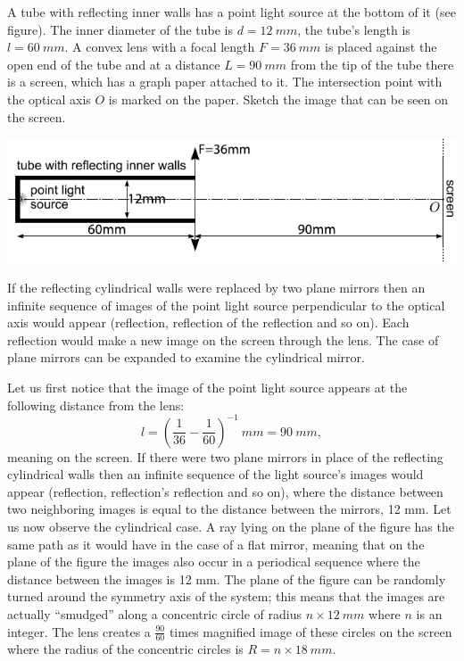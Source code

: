 {\ifEngStatement
A tube with reflecting inner walls has a point light source at the bottom of it (see figure). The inner diameter of the tube is $d=\SI{12}{mm}$, the tube’s length is $l=\SI{60}{mm}$. A convex lens with a focal length $F=\SI{36}{mm}$ is placed against the open end of the tube and at a distance $L=\SI{90}{mm}$ from the tip of the tube there is a screen, which has a graph paper attached to it. The intersection point with the optical axis $O$ is marked on the paper. Sketch the image that can be seen on the screen.
\begin{center}
\includegraphics[width=\textwidth]{2012-v3g-06-toru-valgusallikas-lxxts_ing}
\end{center}
\fi


\ifEngHint
If the reflecting cylindrical walls were replaced by two plane mirrors then an infinite sequence of images of the point light source perpendicular to the optical axis would appear (reflection, reflection of the reflection and so on). Each reflection would make a new image on the screen through the lens. The case of plane mirrors can be expanded to examine the cylindrical mirror.
\fi


\ifEngSolution
Let us first notice that the image of the point light source appears at the following distance from the lens:
$$l=\left(\frac 1{36}-\frac 1{60}\right)^{-1}\SI{}{mm}=\SI{90}{mm},$$ 
meaning on the screen. If there were two plane mirrors in place of the reflecting cylindrical walls then an infinite sequence of the light source’s images would appear (reflection, reflection’s reflection and so on), where the distance between two neighboring images is equal to the distance between the mirrors, 12 mm. Let us now observe the cylindrical case. A ray lying on the plane of the figure has the same path as it would have in the case of a flat mirror, meaning that on the plane of the figure the images also occur in a periodical sequence where the distance between the images is 12 mm. The plane of the figure can be randomly turned around the symmetry axis of the system; this means that the images are actually “smudged” along a concentric circle of radius $n\times\SI{12}{mm}$ where $n$ is an integer. The lens creates a $\frac{90}{60}$ times magnified image of these circles on the screen where the radius of the concentric circles is $R=n\times \SI{18}{mm}$.
\fi
}
